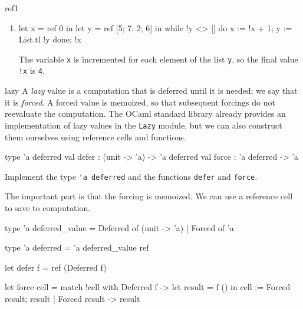 \begin{exercise}{ref1}
\begin{enumerate}
\item

\begin{ocamllisting}
let x = ref 0 in
let y = ref [5; 7; 2; 6] in
while !y <> [] do
   x := !x + 1;
   y := List.tl !y
done;
!x
\end{ocamllisting}

\begin{answer}\ifanswers
The variable \hbox{\lstinline/x/} is incremented for each element of the list \hbox{\lstinline/y/}, so the final
value \hbox{\lstinline/!x/} is \hbox{\lstinline/4/}.
\fi\end{answer}

\end{enumerate}
\end{exercise}

%
\begin{exercise}{lazy}
\label{keyword:lazy}
A \emph{lazy} value is a computation that is deferred until it is needed; we say that it is
\emph{forced}.  A forced value is memoized, so that subsequent forcings do not reevaluate the
computation.  The OCaml standard library already provides an implementation of lazy values in the
\hbox{\lstinline/Lazy/} module, but we can also construct them ourselves using reference cells and
functions.

\begin{ocaml}
type 'a deferred
val defer : (unit -> 'a) -> 'a deferred
val force : 'a deferred -> 'a
\end{ocaml}
%
Implement the type \hbox{\lstinline/'a deferred/} and the functions \hbox{\lstinline/defer/} and \hbox{\lstinline/force/}.

\begin{answer}\ifanswers
The important part is that the forcing is memoized.  We can use a reference cell to save to computation.

\begin{ocaml}
type 'a deferred_value =
   Deferred of (unit -> 'a)
 | Forced of 'a

type 'a deferred = 'a deferred_value ref

let defer f = ref (Deferred f)

let force cell =
   match !cell with
      Deferred f ->
         let result = f () in
         cell := Forced result;
         result
    | Forced result ->
         result
\end{ocaml}
\fi\end{answer}
\end{exercise}

